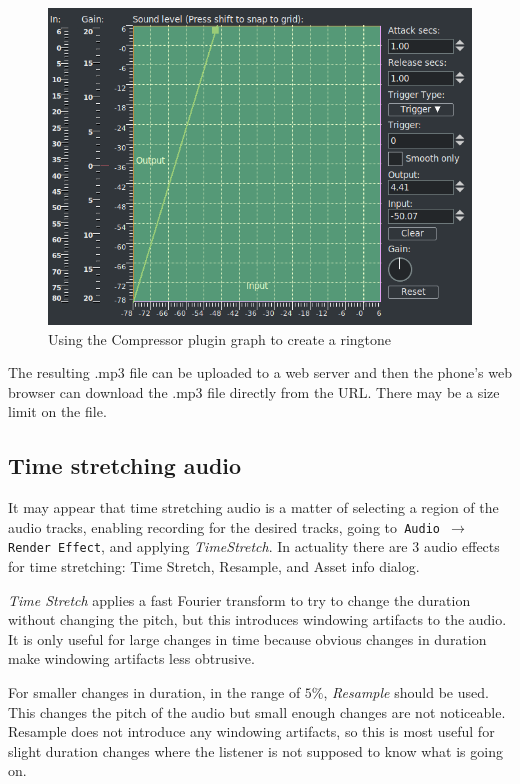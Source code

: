 \begin{figure}[htpb]
	\centering
	\includegraphics[width=0.8\linewidth]{images/ringtone.png}
	\caption{Using the Compressor plugin graph to create a ringtone}
	\label{fig:ringtone}
\end{figure}

The resulting .mp3 file can be uploaded to a web server and then the phone's web browser can download the .mp3 file directly from the URL. There may be a size limit on the file.

\subsection{Time stretching audio}%
\label{sub:time_stretching_audio}

It may appear that time stretching audio is a matter of selecting a region of the audio tracks, enabling recording for the desired tracks, going to\texttt{ Audio $\rightarrow$ Render Effect}, and applying \textit{TimeStretch}. In actuality there are 3 audio effects for time stretching: Time Stretch, Resample, and Asset info dialog.

\textit{Time Stretch} applies a fast Fourier transform to try to change the duration without changing the pitch, but this introduces windowing artifacts to the audio. It is only useful for large changes in time because obvious changes in duration make windowing artifacts less obtrusive.

For smaller changes in duration, in the range of $5\%$, \textit{Resample} should be used. This changes the pitch of the audio but small enough changes are not noticeable. Resample does not introduce any windowing artifacts, so this is most useful for slight duration changes where the listener is not supposed to know what is going on.

